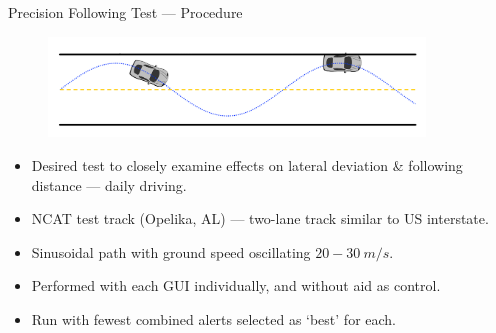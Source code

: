 \documentclass{beamer}
\begin{document}
    \begin{frame}{Precision Following Test --- Procedure}
      \begin{figure}
        \includegraphics[width=10cm]{../graphics/precision_following_diagram.png}
      \end{figure}   
      \begin{itemize} \footnotesize
        \item Desired test to closely examine effects on lateral deviation \& following distance --- daily driving.
        \item NCAT test track (Opelika, AL) --- two-lane track similar to US interstate.
        \item Sinusoidal path with ground speed oscillating $20-30~m/s$.
        \item Performed with each GUI individually, and without aid as control.
        \item Run with fewest combined alerts selected as `best' for each.
      \end{itemize}
    \end{frame}
\end{document}

